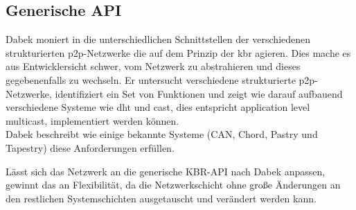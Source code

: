 \subsection{Generische API}
\label{chap:grundlagen:api}
Dabek moniert in \cite{Dabek2003Towards} die unterschiedlichen Schnittstellen der verschiedenen strukturierten p2p-Netzwerke die auf dem Prinzip der \ac{kbr} agieren. Dies mache es aus Entwicklersicht schwer, vom Netzwerk zu abstrahieren und dieses gegebenenfalls zu wechseln. Er untersucht verschiedene strukturierte p2p-Netzwerke, identifiziert ein Set von Funktionen  und zeigt wie darauf aufbauend verschiedene Systeme wie \ac{dht} und \ac{cast}, dies entspricht application level multicast, implementiert werden können.\\
Dabek beschreibt wie einige bekannte Systeme (CAN, Chord, Pastry und Tapestry) diese Anforderungen erfüllen.

Lässt sich das Netzwerk an die generische KBR-API nach Dabek anpassen, gewinnt das an Flexibilität, da die Netzwerkschicht ohne große Änderungen an den restlichen Systemschichten ausgetauscht und verändert werden kann.
